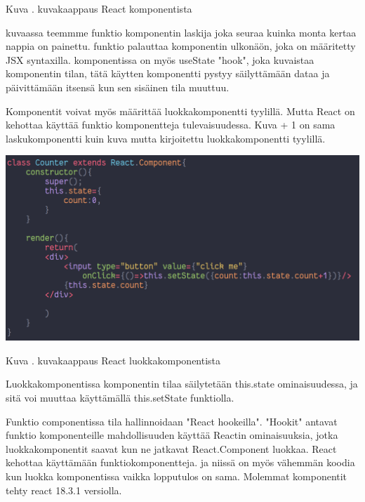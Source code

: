 Kuva \getImgCount{}. kuvakaappaus React komponentista
\medskip

kuvaassa teemmme funktio komponentin laskija joka seuraa kuinka monta kertaa nappia on painettu.
funktio palauttaa komponentin ulkonäön, joka on määritetty JSX syntaxilla.
komponentissa on myös useState "hook"{}, joka kuvaistaa komponentin tilan, tätä käytten komponentti pystyy säilyttämään dataa ja päivittämään itsensä kun sen sisäinen tila muuttuu.
\medskip

Komponentit voivat myös määrittää luokkakomponentti tyylillä. Mutta React on kehottaa käyttää funktio komponentteja tulevaisuudessa.
Kuva {\the\numexpr \theimgCounter + 1}{} on sama laskukomponentti kuin kuva \theimgCounter{} mutta kirjoitettu luokkakomponentti tyylillä. 
\medskip
\bigskip


\includegraphics[width=15cm]{src/public/oppar/class_.png}

Kuva \getImgCount{}. kuvakaappaus React luokkakomponentista
\medskip


Luokkakomponentissa komponentin tilaa säilytetään this.state ominaisuudessa, ja sitä voi muuttaa käyttämällä this.setState funktiolla. 
\medskip


Funktio componentissa tila hallinnoidaan "React hookeilla"{}. 
"Hookit"{} antavat funktio komponenteille mahdollisuuden käyttää Reactin ominaisuuksia, 
jotka luokkakomponentit saavat kun ne jatkavat React.Component luokkaa.
%
React kehottaa käyttämään funktiokomponentteja. ja niissä on myös vähemmän koodia kun luokka komponentissa vaikka lopputulos on sama.
Molemmat komponentit tehty react 18.3.1 versiolla.







